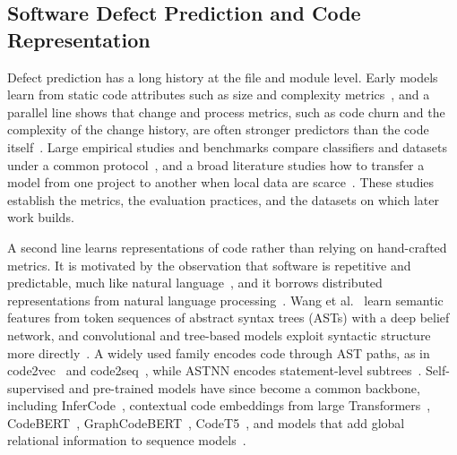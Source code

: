 \documentclass[final,5p,times,twocolumn]{elsarticle}
\theoremstyle{plain}
\begin{document}
\subsection{Software Defect Prediction and Code Representation}
\label{subsec:coderep}
Defect prediction has a long history at the file and module level. Early models learn from static code attributes such as size and complexity metrics~\cite{menzies2007data}, and a parallel line shows that change and process metrics, such as code churn and the complexity of the change history, are often stronger predictors than the code itself~\cite{nagappan2005use,moser2008comparative,hassan2009predicting}. Large empirical studies and benchmarks compare classifiers and datasets under a common protocol~\cite{lessmann2008benchmarking,hall2012systematic,dambros2012evaluating}, and a broad literature studies how to transfer a model from one project to another when local data are scarce~\cite{zimmermann2009cross,nam2013transfer}. These studies establish the metrics, the evaluation practices, and the datasets on which later work builds.

A second line learns representations of code rather than relying on hand-crafted metrics. It is motivated by the observation that software is repetitive and predictable, much like natural language~\cite{hindle2012naturalness}, and it borrows distributed representations from natural language processing~\cite{mikolov2013distributed}. Wang et al.~\cite{wang2016automatically} learn semantic features from token sequences of abstract syntax trees (ASTs) with a deep belief network, and convolutional and tree-based models exploit syntactic structure more directly~\cite{mou2016convolutional,li2017software,tai2015improved}. A widely used family encodes code through AST paths, as in code2vec~\cite{alon2019code2vec} and code2seq~\cite{alon2019code2seq}, while ASTNN encodes statement-level subtrees~\cite{zhang2019astnn}. Self-supervised and pre-trained models have since become a common backbone, including InferCode~\cite{bui2021infercode}, contextual code embeddings from large Transformers~\cite{kanade2020learning}, CodeBERT~\cite{feng2020codebert}, GraphCodeBERT~\cite{guo2021graphcodebert}, CodeT5~\cite{wang2021codet5}, and models that add global relational information to sequence models~\cite{hellendoorn2020global}.
\end{document}
